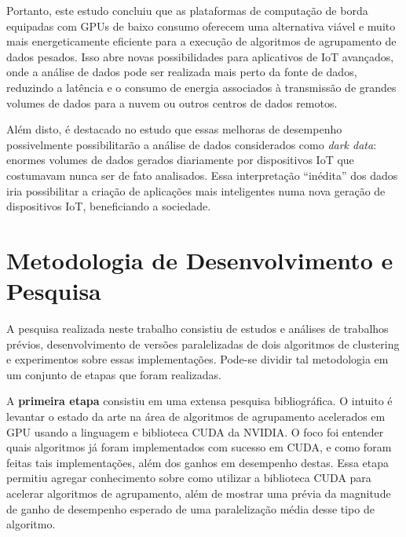 \documentclass[12pt,
openright, 
oneside, %
a4paper,    %
brazil]{facom-ufu-abntex2}
\def\qntAlgrtm{dois}
\begin{document}
Portanto, este estudo concluiu que as plataformas de computação de borda equipadas com GPUs de baixo consumo oferecem uma alternativa viável e muito mais energeticamente eficiente para a execução de algoritmos de agrupamento de dados pesados. Isso abre novas possibilidades para aplicativos de IoT avançados, onde a análise de dados pode ser realizada mais perto da fonte de dados, reduzindo a latência e o consumo de energia associados à transmissão de grandes volumes de dados para a nuvem ou outros centros de dados remotos.

Além disto, é destacado no estudo que essas melhoras de desempenho possivelmente possibilitarão a análise de dados considerados como \textit{dark data}: enormes volumes de dados gerados diariamente por dispositivos IoT que costumavam nunca ser de fato analisados. Essa interpretação \enquote{inédita} dos dados iria possibilitar a criação de aplicações mais inteligentes numa nova geração de dispositivos IoT, beneficiando a sociedade.





\chapter{Metodologia de Desenvolvimento e Pesquisa}


A pesquisa realizada neste trabalho consistiu de estudos e análises de trabalhos prévios, desenvolvimento de versões paralelizadas de \qntAlgrtm{} algoritmos de clustering e experimentos sobre essas implementações. Pode-se dividir tal metodologia em um conjunto de etapas que foram realizadas.

A \textbf{primeira etapa} consistiu em uma extensa pesquisa bibliográfica. O intuito é levantar o estado da arte na área de algoritmos de agrupamento acelerados em GPU usando a linguagem e biblioteca CUDA da NVIDIA. O foco foi entender quais algoritmos já foram implementados com sucesso em CUDA, e como foram feitas tais implementações, além dos ganhos em desempenho destas. Essa etapa permitiu agregar conhecimento sobre como utilizar a biblioteca CUDA para acelerar algoritmos de agrupamento, além de mostrar uma prévia da magnitude de ganho de desempenho esperado de uma paralelização média desse tipo de algoritmo.
\end{document}

